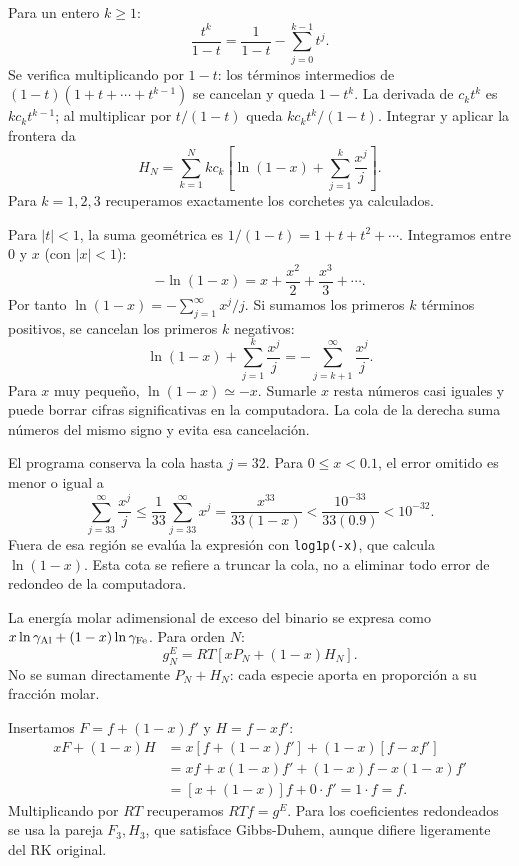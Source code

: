 Para un entero $k\geq1$:
\[
\frac{t^k}{1-t}=\frac1{1-t}-\sum_{j=0}^{k-1}t^j.
\]
Se verifica multiplicando por $1-t$: los términos intermedios de $(1-t)(1+t+\cdots+t^{k-1})$ se cancelan y queda $1-t^k$. La derivada de $c_kt^k$ es $kc_kt^{k-1}$; al multiplicar por $t/(1-t)$ queda $kc_kt^k/(1-t)$. Integrar y aplicar la frontera da
\[
H_N=\sum_{k=1}^Nkc_k\left[\ln(1-x)+\sum_{j=1}^{k}\frac{x^j}{j}\right].
\]
Para $k=1,2,3$ recuperamos exactamente los corchetes ya calculados.

Para $|t|<1$, la suma geométrica es $1/(1-t)=1+t+t^2+\cdots$. Integramos entre 0 y $x$ (con $|x|<1$):
\[
-\ln(1-x)=x+\frac{x^2}{2}+\frac{x^3}{3}+\cdots.
\]
Por tanto $\ln(1-x)=-\sum_{j=1}^{\infty}x^j/j$. Si sumamos los primeros $k$ términos positivos, se cancelan los primeros $k$ negativos:
\[
\ln(1-x)+\sum_{j=1}^k\frac{x^j}{j}=-\sum_{j=k+1}^{\infty}\frac{x^j}{j}.
\]
Para $x$ muy pequeño, $\ln(1-x)\simeq-x$. Sumarle $x$ resta números casi iguales y puede borrar cifras significativas en la computadora. La cola de la derecha suma números del mismo signo y evita esa cancelación.

El programa conserva la cola hasta $j=32$. Para $0\leq x<0.1$, el error omitido es menor o igual a
\[
\sum_{j=33}^{\infty}\frac{x^j}{j}\leq\frac1{33}\sum_{j=33}^{\infty}x^j
=\frac{x^{33}}{33(1-x)}<\frac{10^{-33}}{33(0.9)}<10^{-32}.
\]
Fuera de esa región se evalúa la expresión con \texttt{log1p(-x)}, que calcula $\ln(1-x)$. Esta cota se refiere a truncar la cola, no a eliminar todo error de redondeo de la computadora.

La energía molar adimensional de exceso del binario se expresa como $x\ln\gamma_{\mathrm{Al}}+(1-x)\ln\gamma_{\mathrm{Fe}}$. Para orden $N$:
\[
g_N^E=RT[xP_N+(1-x)H_N].
\]
No se suman directamente $P_N+H_N$: cada especie aporta en proporción a su fracción molar.

Insertamos $F=f+(1-x)f'$ y $H=f-xf'$:
\begin{align*}
xF+(1-x)H
&=x[f+(1-x)f']+(1-x)[f-xf']\\
&=xf+x(1-x)f'+(1-x)f-x(1-x)f'\\
&=[x+(1-x)]f+0\cdot f'=1\cdot f=f.
\end{align*}
Multiplicando por $RT$ recuperamos $RTf=g^E$. Para los coeficientes redondeados se usa la pareja $F_3,H_3$, que satisface Gibbs-Duhem, aunque difiere ligeramente del RK original.

